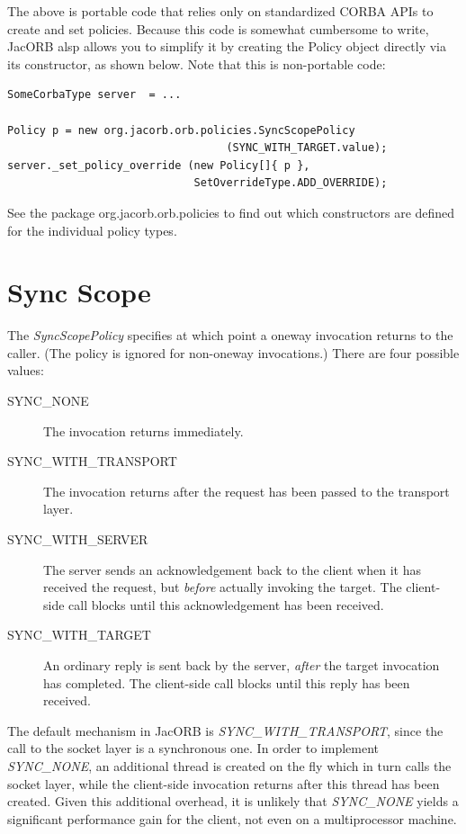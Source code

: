 The above is portable code that relies only on standardized CORBA APIs
to create and set policies.  Because this code is somewhat cumbersome
to write, JacORB alsp allows you to simplify it by creating the Policy
object directly via its constructor, as shown below. Note that this is
non-portable code:

\begin{verbatim}
SomeCorbaType server  = ...

Policy p = new org.jacorb.orb.policies.SyncScopePolicy
                                  (SYNC_WITH_TARGET.value);
server._set_policy_override (new Policy[]{ p },
                             SetOverrideType.ADD_OVERRIDE);
\end{verbatim}

See the package org.jacorb.orb.policies to find out which
constructors are defined for the individual policy types.

\section{Sync Scope}

The \emph{SyncScopePolicy} specifies at which point a oneway
invocation returns to the caller.  (The policy is ignored for
non-oneway invocations.)  There are four possible
values:

\begin{description}
\item[SYNC\_NONE] The invocation returns immediately.
\item[SYNC\_WITH\_TRANSPORT] The invocation returns after the request
  has been passed to the transport layer.
\item[SYNC\_WITH\_SERVER] The server sends an
  acknowledgement back to the client when it has received the
  request, but \emph{before} actually invoking the target.  The
  client-side call blocks until this acknowledgement has been
  received.
\item[SYNC\_WITH\_TARGET] An ordinary reply is sent back by the
  server, \emph{after} the target invocation has completed.  The
  client-side call blocks until this reply has been received.
\end{description}

The default mechanism in JacORB is \emph{SYNC\_WITH\_TRANSPORT},
since the call to the socket layer is a synchronous one.  In order to
implement \emph{SYNC\_NONE}, an additional thread is created on the
fly which in turn calls the socket layer, while the client-side
invocation returns after this thread has been created.  Given this
additional overhead, it is unlikely that \emph{SYNC\_NONE} yields a
significant performance gain for the client, not even on a
multiprocessor machine.

